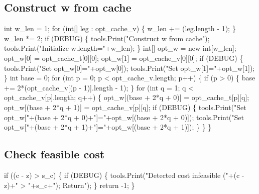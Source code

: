 \documentclass{article}
\def\nwendcode{\endtrivlist \endgroup}      %
\let\nwdocspar=\par
\begin{document}
\subsection{Construct w from cache}
\nwenddocs{}\endmoddef{}
int w_len = 1;
for (int[] leg : opt_cache_v) \{
  w_len += (leg.length - 1);
\}
w_len *= 2;
if (DEBUG) \{
  tools.Print("Construct w from cache");
  tools.Print("Initialize w.length="+w_len);
\}
int[] opt_w = new int[w_len];
opt_w[0] = opt_cache_t[0][0];
opt_w[1] = opt_cache_v[0][0];
if (DEBUG) \{
  tools.Print("Set opt_w[0]="+opt_w[0]);
  tools.Print("Set opt_w[1]="+opt_w[1]);
\}
int base = 0;
for (int p = 0; p < opt_cache_v.length; p++) \{
  if (p > 0) \{
    base += 2*(opt_cache_v[(p - 1)].length - 1);
  \}
  for (int q = 1; q < opt_cache_v[p].length; q++) \{
    opt_w[(base + 2*q + 0)] = opt_cache_t[p][q];
    opt_w[(base + 2*q + 1)] = opt_cache_v[p][q];
    if (DEBUG) \{
      tools.Print("Set opt_w["+(base + 2*q + 0)+"]="+opt_w[(base + 2*q + 0)]);
      tools.Print("Set opt_w["+(base + 2*q + 1)+"]="+opt_w[(base + 2*q + 1)]);
    \}
  \}
\}
\nwendcode{}\nwdocspar

\subsection{Check feasible cost}
\nwenddocs{}\endmoddef{}
if ((c - z) > s_c) \{
  if (DEBUG) \{
    tools.Print("Detected cost infeasible ("+(c - z)+" > "+s_c+"); Return");
  \}
  return -1;
\}
\nwendcode{}\nwdocspar
\end{document}
